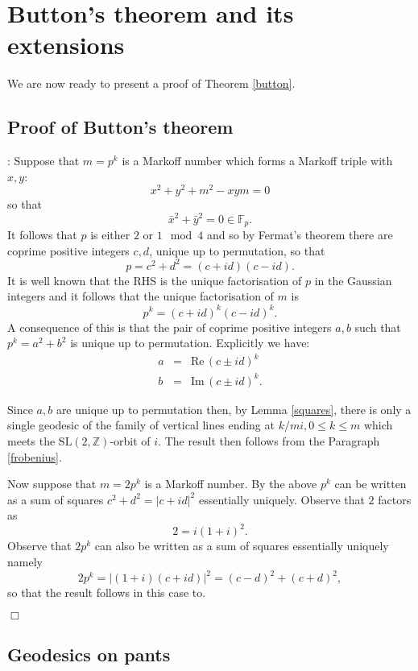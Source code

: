 \documentclass[12pt,a4paper]{amsart}
\def\ZZ{\mathbb{Z}}
\def\fp{\mathbb{F}_p}
\def\sl2{\mathrm{SL}(2, \ZZ)}
\begin{document}
\section{Button's theorem and its extensions}

We are now ready to present a proof of Theorem \ref{button}.

 
\subsection{Proof of Button's theorem}

 \proof: 
Suppose that $m=p^k$ is a Markoff number which forms a Markoff triple with $x,y$:
$$x^2 + y^2 + m^2 - xym = 0$$
so that 
$$\bar{x}^2 + \bar{y}^2 = 0 \in \fp.$$
It follows that $p$ is either $2$ or $1 \mod 4$ and 
so by Fermat's theorem  there are coprime positive integers $c,d$,
 unique up to permutation,
so that  $$p = c^2 + d^2 = (c + id)(c - id).$$
It is well known that the RHS is the unique factorisation of $p$ in the Gaussian integers
and it follows that the unique factorisation of $m$ is
$$p^k = (c + id)^k(c - id)^k.$$
A consequence of this is that the pair of coprime positive integers $a,b$ such that $p^k = a^2 + b^2$
is unique up to permutation. Explicitly we have:
\begin{eqnarray}
a &=& \mathrm{Re}\, (c\pm id)^k \\
b &=& \mathrm{Im}\, (c\pm id)^k.
\end{eqnarray}

\noindent
Since $a,b$ are unique up to permutation then, by Lemma \ref{squares}, there is
only  a single  geodesic of the family of vertical lines ending at  $k/mi, 0\leq k \leq m$
which meets the $\sl2$-orbit of $i$. The result then follows from the
Paragraph \ref{frobenius}.

Now suppose that  $m=2p^k$ is a Markoff number.
By the above  $p^k$ can be written as a sum of squares $c^2 + d^2 = |c + id|^2$ 
essentially uniquely.
Observe that  $2$ factors as 
$$ 2 = i(1+i)^2.$$
Observe that $2 p^k$ can also  be written as a sum of squares
essentially uniquely namely
$$2p^k = |(1+i) (c + id) |^2 =  (c-d)^2 + (c+d)^2,$$ 
so that the result follows in this case to.

\hfill $\Box$

\subsection{Geodesics on pants}\label{geos on pants}
\end{document}
